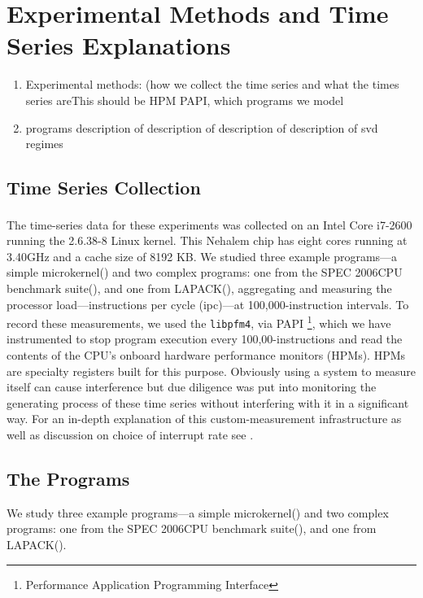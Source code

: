 \section{Experimental Methods and Time Series Explanations}

 \begin{enumerate}
 \item  Experimental methods: (how we collect the time series and what the times series areThis should be HPM PAPI, which programs we model
\item programs 
\subitem description of \col
\subitem description of \gcc
\subitem description of \svd 
\subitem description of svd regimes
 \end{enumerate}


\subsection{Time Series Collection}

The time-series data for these experiments was collected on an Intel Core\textsuperscript{\textregistered} i7-2600 running the 2.6.38-8 Linux
kernel.  This Nehalem chip has eight cores running at 3.40GHz and a cache size
of 8192 KB.  We studied three example programs---a simple microkernel(\col) and two complex programs: one from the
SPEC 2006CPU benchmark suite(\gcc), and one from LAPACK(\svd), aggregating and measuring the processor load---instructions per cycle (ipc)---at 100,000-instruction intervals.  To record these measurements,
we used the {\tt libpfm4}, via PAPI
\footnote{Performance Application Programming Interface}\cite{papi-website}, which we have instrumented to stop program execution every 100,00-instructions and read the contents of the CPU's onboard hardware performance monitors (HPMs). HPMs are specialty registers built for this purpose. Obviously using a system to measure itself can cause interference but due diligence was put into monitoring the generating process of these time series without interfering with it in a significant way. For an in-depth explanation of this custom-measurement infrastructure as well as discussion on choice of interrupt rate see 
\cite{zach-IDA10,mytkowicz09,todd-phd}.



\subsection{The Programs}
We study three example programs---a simple microkernel(\col) and two complex programs: one from the
SPEC 2006CPU benchmark suite(\gcc), and one from LAPACK(\svd).
